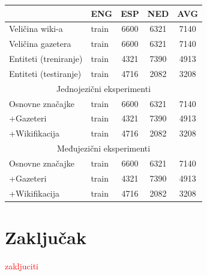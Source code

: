 \documentclass[times, utf8, seminar]{fer}
\newcommand\myworries[1]{\textcolor{red}{#1}}
\begin{document}
\begin{center}
\begin{tabular}{ llccc }
\hline
 & ENG & ESP & NED & AVG\\ 
\hline
Veličina wiki-a & train & 6600 & 6321 & 7140 \\
Veličina gazetera & train & 6600 & 6321 & 7140 \\
Entiteti (treniranje) & train & 4321 & 7390 & 4913 \\
Entiteti (testiranje) & train & 4716 & 2082 & 3208 \\
\hline
\multicolumn{5}{c}{Jednojezični eksperimenti } \\
\hline
Osnovne značajke & train & 6600 & 6321 & 7140 \\
+Gazeteri & train & 4321 & 7390 & 4913 \\
+Wikifikacija & train & 4716 & 2082 & 3208 \\
\hline
\multicolumn{5}{c}{Međujezični eksperimenti } \\
\hline
Osnovne značajke & train & 6600 & 6321 & 7140 \\
+Gazeteri & train & 4321 & 7390 & 4913 \\
+Wikifikacija & train & 4716 & 2082 & 3208 \\
\hline
\end{tabular}
\end{center}

\chapter{Zaključak}
\myworries{zakljuciti}


\nocite{*}

\begin{sazetak}


\end{sazetak}
\begin{abstract}


\end{abstract}
\end{document}
